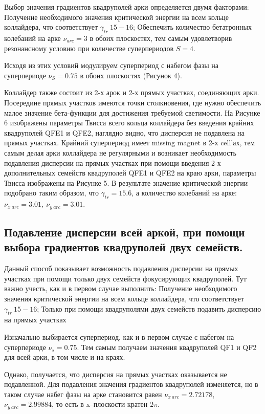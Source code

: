 \par Выбор значения градиентов квадруполей арки определяется двумя факторами:
	Получение необходимого значения критической энергии на всем кольце коллайдера, что соответствует $\gamma_{tr}~15-16$;
	Обеспечить количество бетатронных колебаний на арке $\nu_{arc}=3$ в обоих плоскостях, тем самым удовлетворив резонансному условию при количестве суперпериодов $S=4$.
	
\par Исходя из этих условий модулируем суперпериод с набегом фазы на суперпериоде $\nu_S=0.75$ в обоих плоскостях (Рисунок 4).

\par Коллайдер также состоит из 2-х арок и 2-х прямых участках, соединяющих арки. Посередине прямых участков имеются точки столкновения, где нужно обеспечить малое значение бета-функции для достижения требуемой светимости. На Рисунке 6 изображены параметры Твисса всего кольца коллайдера без введения крайних квадруполей QFE1 и QFE2, наглядно видно, что дисперсия не подавлена на прямых участках. Крайний суперпериод имеет missing magnet в 2-х cell’ах, тем самым делая арки коллайдера не регулярными и возникает необходимость подавления дисперсии на прямых участках при помощи введения 2-х дополнительных семейств квадруполей QFE1 и QFE2 на краю арки, параметры Твисса изображены на Рисунке 5.
В результате значение критической энергии подобрано таким образом, что $\gamma_{tr}=15.6$, а количество колебаний на арке: $\nu_{x\ arc}=3.01,\ \nu_{y\ arc}=3.01$.


\subsection{Подавление дисперсии всей аркой, при помощи выбора градиентов квадруполей двух семейств.}\label{subsec:transition_variation/methods/disp_supperssion_AS}	

Данный способ показывает возможность подавления дисперсии на прямых участках при помощи только двух семейств фокусирующих квадруполей. 
Тут важно учесть, как и в первом случае выполнить:
	Получение необходимого значения критической энергии на всем кольце коллайдера, что соответствует $\gamma_{tr}~15-16$;
	Только при помощи квадруполями двух семейств подавить дисперсию на прямых участках
	
\par Изначально выбирается суперпериод, как и в первом случае с набегом на суперпериоде $\nu_s=0.75$. Тем самым получаем значения квадруполей QF1 и QF2 для всей арки, в том числе и на краях.
\par Однако, получается, что дисперсия на прямых участках оказывается не подавленной. Для подавления значения градиентов квадруполей изменяется, но в таком случае набег фазы на арке становится равен $\nu_{x\ arc}=2.72178$,\ $\nu_{y\ arc}=2.99884$, то есть в x–плоскости кратен $2\pi$.

